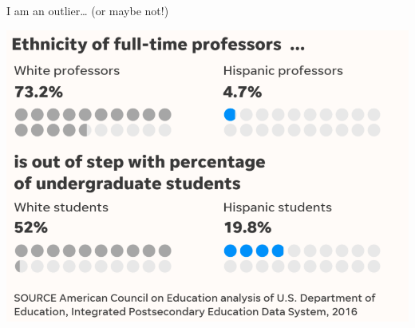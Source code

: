 \documentclass[
  8pt,
  ignorenonframetext,
  dvipsnames]{beamer}
\begin{document}
\begin{frame}{I am an outlier\ldots{} (or maybe not!)}
\protect\hypertarget{i-am-an-outlier-or-maybe-not}{}

\includegraphics{professors.png}

\end{frame}
\end{document}
